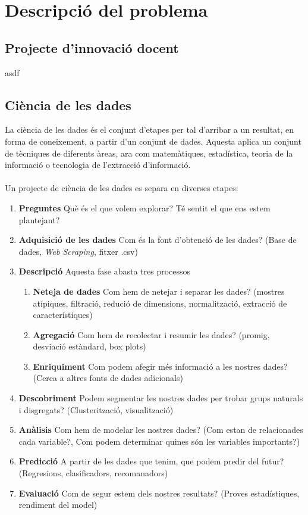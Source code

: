 \documentclass[12pt,a4paper,catalan]{article}
\begin{document}
\newpage


\section{Descripció del problema}
\subsection{Projecte d'innovació docent}
asdf
\newpage

\subsection{Ciència de les dades}
La ciència de les dades és el conjunt d'etapes per tal d'arribar a un resultat, en forma de coneixement, a partir d'un conjunt de dades. Aquesta aplica un conjunt de tècniques de diferents àreas, ara com matemàtiques, estadística, teoria de la informació o tecnologia de l'extracció d'informació.
\\
\\
Un projecte de ciència de les dades es separa en diverses etapes:
\begin{enumerate}
	\item \textbf{Preguntes} Què és el que volem explorar? Té sentit el que ens estem plantejant?
	\item \textbf{Adquisició de les dades} Com és la font d'obtenció de les dades? (Base de dades, \textit{Web Scraping}, fitxer .csv)
	\item \textbf{Descripció} Aquesta fase abasta tres processos
	\begin{enumerate}
		\item \textbf{Neteja de dades} Com hem de netejar i separar les dades? (mostres atípiques, filtració, redució de dimensions, normalització, extracció de característiques)
		\item \textbf{Agregació} Com hem de recolectar i resumir les dades? (promig, desviació estàndard, box plots)
		\item \textbf{Enriquiment} Com podem afegir més informació a les nostres dades? (Cerca a altres fonts de dades adicionals)
	\end{enumerate}
	\item \textbf{Descobriment} Podem segmentar les nostres dades per trobar grups naturals i disgregats? (Clusterització, visualització)
	\item \textbf{Anàlisis} Com hem de modelar les nostres dades? (Com estan de relacionades cada variable?, Com podem determinar quines són les variables importants?)
	\item \textbf{Predicció} A partir de les dades que tenim, que podem predir del futur? (Regresions, clasificadors, recomanadors)
	\item \textbf{Evaluació} Com de segur estem dels nostres resultats? (Proves estadístiques, rendiment del model)
\end{enumerate}
\end{document}
